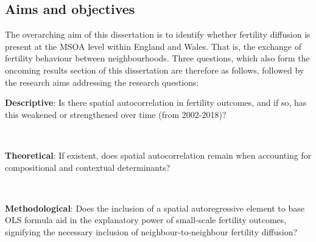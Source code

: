 \documentclass[12pt,twoside]{reedthesis}
\begin{document}
\hypertarget{Aims}{%
\subsection{Aims and objectives}\label{Aims}}

The overarching aim of this dissertation is to identify whether fertility diffusion is present at the MSOA level within England and Wales. That is, the exchange of fertility behaviour between neighbourhoods. Three questions, which also form the oncoming results section of this dissertation are therefore as follows, followed by the research aims addressing the research questions:\\
\hspace*{0.333em}

\textbf{Descriptive}: Is there spatial autocorrelation in fertility outcomes, and if so, has this weakened or strengthened over time (from 2002-2018)?

~

\textbf{Theoretical}: If existent, does spatial autocorrelation remain when accounting for compositional and contextual determinants?

~

\textbf{Methodological}:
Does the inclusion of a spatial autoregressive element to base OLS formula aid in the explanatory power of small-scale fertility outcomes, signifying the necessary inclusion of neighbour-to-neighbour fertility diffusion?
\end{document}
